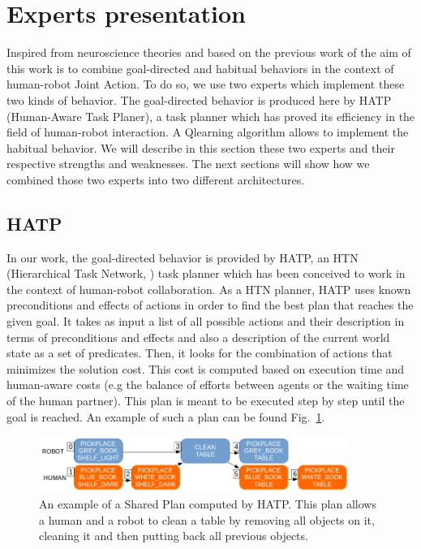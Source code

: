 \documentclass[english,a4paper,11pt,twoside]{StyleThese}
\begin{document}
\section{Experts presentation}

Inspired from neuroscience theories and based on the previous work of \cite{renaudo2014design} the aim of this work is to combine goal-directed and habitual behaviors in the context of human-robot Joint Action. To do so, we use two experts which implement these two kinds of behavior. The goal-directed behavior is produced here by HATP (Human-Aware Task Planer), a task planner which has proved its efficiency in the field of human-robot interaction. A Qlearning algorithm allows to implement the habitual behavior. We will describe in this section these two experts and their respective strengths and weaknesses. The next sections will show how we combined those two experts into two different architectures.

\subsection{HATP}

In our work, the goal-directed behavior is provided by HATP, an HTN (Hierarchical Task Network, \cite{erol1994htn}) task planner which has been conceived to work in the context of human-robot collaboration.  As a HTN planner, HATP uses known preconditions and effects of actions in order to find the best plan that reaches the given goal. It takes as input a list of all possible actions and their description in terms of preconditions and effects and also a description of the current world state as a set of predicates. Then, it looks for the combination of actions that minimizes the solution cost. This cost is computed based on execution time and human-aware costs (e.g the balance of efforts between agents or the waiting time of the human partner). This plan is meant to be executed step by step until the goal is reached. An example of such a plan can be found Fig.~\ref{fig:examplePlan}.

\begin{figure}[!h]
	\centering
    \includegraphics[width=0.9\textwidth]{figs/Chapter7/SharedPlan.png}
    \caption{An example of a Shared Plan computed by HATP. This plan allows a human and a robot to clean a table by removing all objects on it, cleaning it and then putting back all previous objects.}
    \label{fig:examplePlan}
\end{figure}
\end{document}
